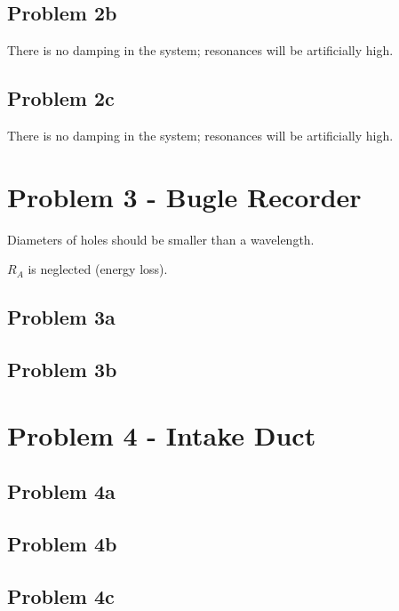 \subsection*{Problem 2b}

There is no damping in the system;  resonances will be artificially high.

\subsection*{Problem 2c}

There is no damping in the system;  resonances will be artificially high.










\newpage
\section*{Problem 3 - Bugle Recorder}

Diameters of holes should be smaller than a wavelength.

$R_A$ is neglected (energy loss).

\subsection*{Problem 3a}

\subsection*{Problem 3b}










\newpage
\section*{Problem 4 - Intake Duct}

\subsection*{Problem 4a}

\subsection*{Problem 4b}

\subsection*{Problem 4c}

